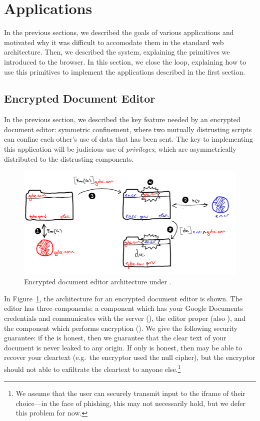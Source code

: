 \section{Applications}
\label{sec:apps}

In the previous sections, we described the goals of various applications
and motivated why it was difficult to accomodate them in the standard
web architecture.  Then, we described the \sys{} system, explaining the
primitives we introduced to the browser.  In this section, we close the
loop, explaining how to use this primitives to implement the
applications described in the first section.

\subsection{Encrypted Document Editor}

In the previous section, we described the key feature needed by an
encrypted document editor: symmetric confinement, where two mutually
distrusting scripts can confine each other's use of data that has been
sent.  The key to implementing this application will be judicious use of
\emph{privileges}, which are asymmetrically distributed to the
distrusting components.

\begin{figure}
\centerline{\includegraphics[width=\columnwidth]{editor2-byhand}}
\caption{\label{fig:editor} Encrypted document editor architecture
under \sys{}.}
\end{figure}

In Figure~\ref{fig:editor}, the architecture for an encrypted document
editor is shown.  The editor has three components: a component which has
your Google Documents credentials and communicates with the server (), the
editor proper (also ), and the component which performs encryption ().  We give the
following security guarantee: if the  is honest, then we
guarantee that the clear text of your document is never leaked to any
origin.  If only  is honest, then  may
be able to recover your cleartext (e.g.\ the encryptor used the null
cipher), but the encryptor should not able to exfiltrate the cleartext
to anyone else.\footnote{We assume that the user can securely transmit
input to the iframe of their choice---in the face of phishing, this may
not necessarily hold, but we defer this problem for now.}

